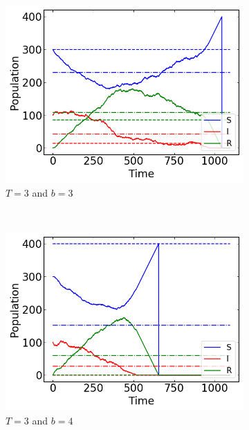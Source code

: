 \begin{figure}[H]
\begin{subfigure}{0.49\textwidth}
         \includegraphics[width=\linewidth]{../fig/texfig/MC_b3T3.png}
         \caption{$T = 3$ and $b =3$}
    \end{subfigure}
     ~ 
    \begin{subfigure}{0.49\textwidth}
         \centering
         \includegraphics[width=\linewidth]{../fig/texfig/MC_b4T3.png}
         \caption{$T = 3$ and $b =4$ }
    \end{subfigure}
         ~ 
    \begin{subfigure}{0.6\textwidth}
         \centering

\end{subfigure}
\end{figure}
